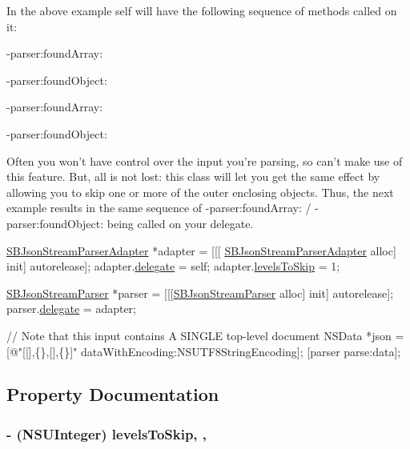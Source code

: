 In the above example {\ttfamily self} will have the following sequence of methods called on it\-:

\begin{DoxyItemize}
\item -\/parser\-:found\-Array\-: \item -\/parser\-:found\-Object\-: \item -\/parser\-:found\-Array\-: \item -\/parser\-:found\-Object\-:\end{DoxyItemize}
Often you won't have control over the input you're parsing, so can't make use of this feature. But, all is not lost\-: this class will let you get the same effect by allowing you to skip one or more of the outer enclosing objects. Thus, the next example results in the same sequence of -\/parser\-:found\-Array\-: / -\/parser\-:found\-Object\-: being called on your delegate.


\begin{DoxyCode}
\hyperlink{interface_s_b_json_stream_parser_adapter}{SBJsonStreamParserAdapter} *adapter = [[[
      \hyperlink{interface_s_b_json_stream_parser_adapter}{SBJsonStreamParserAdapter} alloc] init] autorelease];
adapter.\hyperlink{interface_s_b_json_stream_parser_adapter_a9d336f9c9e1caf3291f80918cb13188e}{delegate} = \textcolor{keyword}{self};
adapter.\hyperlink{interface_s_b_json_stream_parser_adapter_a1b7451c67d9149b14632c228909659bb}{levelsToSkip} = 1;

\hyperlink{interface_s_b_json_stream_parser}{SBJsonStreamParser} *parser = [[[\hyperlink{interface_s_b_json_stream_parser}{SBJsonStreamParser} alloc] init] 
      autorelease];
parser.\hyperlink{interface_s_b_json_stream_parser_a1a4e90ce1ca9b55e7696db77ef6bf20c}{delegate} = adapter;

\textcolor{comment}{// Note that this input contains A SINGLE top-level document}
NSData *json = [\textcolor{stringliteral}{@"[[],\{\},[],\{\}]"} dataWithEncoding:NSUTF8StringEncoding]; 
[parser parse:data];
\end{DoxyCode}
 

\subsection{Property Documentation}
\hypertarget{interface_s_b_json_stream_parser_adapter_a1b7451c67d9149b14632c228909659bb}{
\subsubsection[{levels\-To\-Skip}]{\setlength{\rightskip}{0pt plus 5cm}-\/ (N\-S\-U\-Integer) levels\-To\-Skip\hspace{0.3cm}{\ttfamily [read]}, {\ttfamily [write]}, {\ttfamily [atomic]}}}\label{interface_s_b_json_stream_parser_adapter_a1b7451c67d9149b14632c228909659bb}


